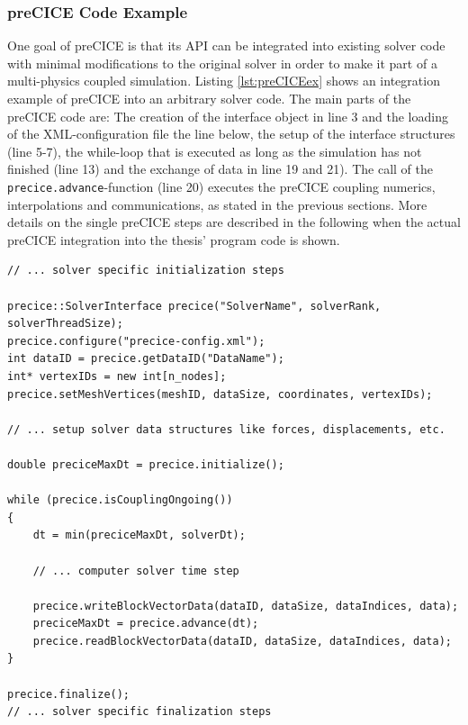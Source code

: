   \subsubsection{preCICE Code Example}\label{sec:Coupl-Impl-Example}
   One goal of preCICE is that its API can be integrated into existing solver code with minimal modifications to the original solver in order to make it part of a multi-physics coupled simulation. Listing \ref{lst:preCICEex} shows an integration example of preCICE into an arbitrary solver code. The main parts of the preCICE code are: The creation of the interface object in line 3 and the loading of the XML-configuration file the line below, the setup of the interface structures (line 5-7), the while-loop that is executed as long as the simulation has not finished (line 13) and the exchange of data in line 19 and 21). The call of the \texttt{precice.advance}-function (line 20) executes the preCICE coupling numerics, interpolations and communications, as stated in the previous sections. More details on the single preCICE steps are described in the following when the actual preCICE integration into the thesis' program code is shown.
\begin{lstlisting}[caption=preCICE Integration Example,label=lst:preCICEex,keepspaces=true]
// ... solver specific initialization steps

precice::SolverInterface precice("SolverName", solverRank, solverThreadSize);
precice.configure("precice-config.xml");
int dataID = precice.getDataID("DataName");
int* vertexIDs = new int[n_nodes];
precice.setMeshVertices(meshID, dataSize, coordinates, vertexIDs);

// ... setup solver data structures like forces, displacements, etc.

double preciceMaxDt = precice.initialize();

while (precice.isCouplingOngoing())
{
	dt = min(preciceMaxDt, solverDt);

	// ... computer solver time step

	precice.writeBlockVectorData(dataID, dataSize, dataIndices, data);
	preciceMaxDt = precice.advance(dt);
	precice.readBlockVectorData(dataID, dataSize, dataIndices, data);
}

precice.finalize();
// ... solver specific finalization steps
\end{lstlisting}
   
